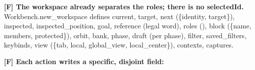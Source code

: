 \documentclass[10pt,a4paper]{article}
\begin{document}
\textbf{{[}F{]} The workspace already separates the roles; there is no {\codefont selectedId}.} {\codefont Workbench.\allowbreak{}new\_\allowbreak{}workspace} defines {\codefont current}, {\codefont target}, {\codefont next} ({\codefont \{identity,\allowbreak{} target\}}), {\codefont inspected}, {\codefont inspected\_\allowbreak{}position}, {\codefont goal}, {\codefont reference} (legal word), {\codefont roles} ({\codefont [A,\allowbreak{} B]}), {\codefont block} ({\codefont \{name,\allowbreak{} members,\allowbreak{} protected\}}), {\codefont orbit}, {\codefont bank}, {\codefont phase}, {\codefont draft} (per phase), {\codefont filter}, {\codefont saved\_\allowbreak{}filters}, {\codefont keybinds}, {\codefont view} ({\codefont \{tab,\allowbreak{} local,\allowbreak{} global\_\allowbreak{}view,\allowbreak{} local\_\allowbreak{}center\}}), {\codefont contexts}, {\codefont captures}.

\textbf{{[}F{]} Each action writes a specific, disjoint field:}
\end{document}
